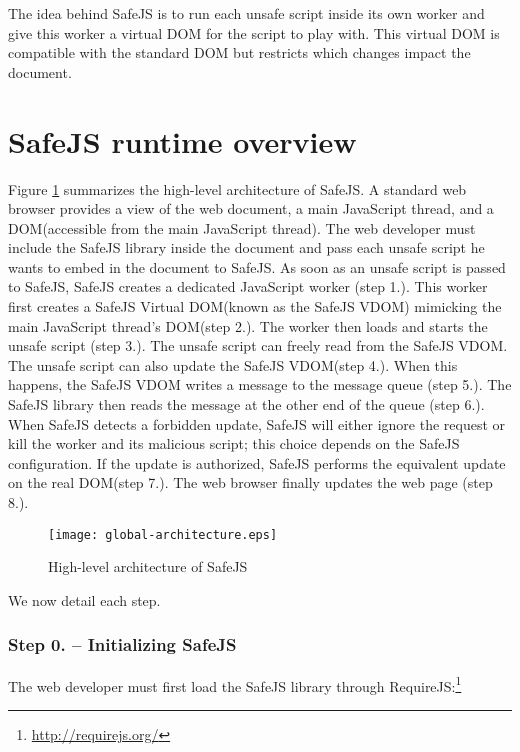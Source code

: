 \documentclass{article}
\newcommand{\ct}[1]{{\textsf{#1}}\xspace}
\newcommand{\js}{JavaScript\xspace}
\newcommand{\safejs}{SafeJS\xspace}
\newcommand{\dom}{DOM\xspace}
\newcommand{\vdom}{\safejs VDOM\xspace}
\newcommand{\requirejs}{RequireJS\xspace}
\begin{document}
The idea behind \safejs is to run each unsafe script inside its own
worker and give this worker a virtual \dom for the script to play with.
This virtual \dom is compatible with the standard \dom but restricts
which changes impact the document.

\section{\safejs runtime overview}

Figure \ref{fig:global-architecture} summarizes the high-level
architecture of \safejs. A standard web browser provides a view of the
web document, a main \js thread, and a \dom (accessible from the main
\js thread). The web developer must include the \safejs
library inside the document and pass each unsafe script he wants to
embed in the document to \safejs. As soon as an unsafe script is
passed to \safejs, \safejs creates a dedicated \js worker (step
\ct{1.}). This worker first creates a \safejs Virtual \dom (known as the \vdom)
mimicking the main \js thread's \dom (step \ct{2.}). The worker then
loads and starts the unsafe script (step \ct{3.}). The unsafe script
can freely read from the \vdom. The unsafe script can also update the
\vdom (step \ct{4.}). When this happens, the \vdom writes a message to
the message queue (step \ct{5.}). The \safejs library then reads the
message at the other end of the queue (step \ct{6.}). When \safejs
detects a forbidden update, \safejs will either ignore the request or
kill the worker and its malicious script; this choice depends on the
\safejs configuration. If the update is authorized, \safejs performs
the equivalent update on the real \dom (step \ct{7.}). The web browser
finally updates the web page (step \ct{8.}).

\begin{figure}
  \centering
  \texttt{[image: global-architecture.eps]}
  \caption{High-level architecture of \safejs}
  \label{fig:global-architecture}
\end{figure}

We now detail each step.

\subsubsection*{Step 0. -- Initializing \safejs}

The web developer must first load the \safejs library through
\requirejs:\footnote{\url{http://requirejs.org/}}
\end{document}
